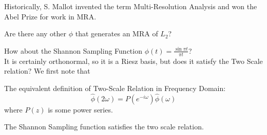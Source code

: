 \documentclass{article}
\begin{document}
\begin{remark}
    Historically, S. Mallot invented the term Multi-Resolution Analysis and won the Abel Prize for work in MRA.
\end{remark}

\begin{question}
    Are there any other $\phi$ that generates an MRA of $L_2$?
\end{question}

How about the Shannon Sampling Function $\phi(t) = \frac{\sin \pi t}{\pi t}$?\\

It is certainly orthonormal, so it is a Riesz basis, but does it satisfy the Two Scale relation? We first note that
\begin{definition}
    The equivalent definition of Two-Scale Relation in Frequency Domain:
    \[\widehat{\phi}(2 \omega) = P(e^{-i\omega}) \widehat{\phi}(\omega)\]
    where $P(z)$ is some power series.
\end{definition}

\begin{proposition}
    The Shannon Sampling function satisfies the two scale relation.
\end{proposition}
\end{document}
